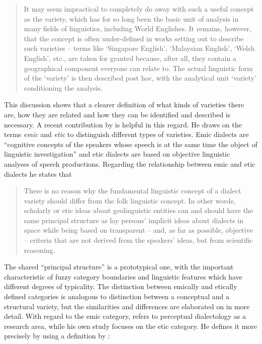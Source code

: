 \begin{quote}
It may seem impractical to completely do away with such a useful concept as the variety, which has for so long been the basic unit of analysis in many fields of linguistics, including World Englishes. It remains, however, that the concept is often under-defined in works setting out to describe such varieties – terms like ‘Singapore English’, ‘Malaysian English’, ‘Welsh English’, etc., are taken for granted because, after all, they contain a geographical component everyone can relate to. The actual linguistic form of the ‘variety’ is then described post hoc, with the analytical unit ‘variety’ conditioning the analysis. \citep[6]{Leimgruber2013b}
\end{quote}

This discussion shows that a clearer definition of what kinds of varieties there are, how they are related and how they can be identified and described is necessary. A recent contribution by \citet{Pickl2016} is helpful in this regard. He draws on the terms \textit{emic} and \textit{etic} to distinguish different types of varieties. Emic dialects are “cognitive concepts of the speakers whose speech is at the same time the object of linguistic investigation” \citep[78]{Pickl2016} and etic dialects are based on objective linguistic analyses of speech productions. Regarding the relationship between emic and etic dialects he states that

\begin{quote}
There is no reason why the fundamental linguistic concept of a dialect variety should differ from the folk linguistic concept. In other words, scholarly or etic ideas about geolinguistic entities can and should have the same principal structure as lay persons’ implicit ideas about dialects in space while being based on transparent – and, as far as possible, objective – criteria that are not derived from the speakers’ ideas, but from scientific reasoning. \citep[78]{Pickl2016}
\end{quote}


The shared “principal structure” is a prototypical one, with the important characteristic of fuzzy category boundaries and linguistic features which have different degrees of typicality. The distinction between emically and etically defined categories is analogous to  distinction between a conceptual and a structural variety, but the similarities and differences are elaborated on in more detail. With regard to the emic category, \citet{Pickl2016} refers to perceptual dialectology as a research area, while his own study focuses on the etic category. He defines it more precisely by using a definition by \citet{Berruto2010}:


